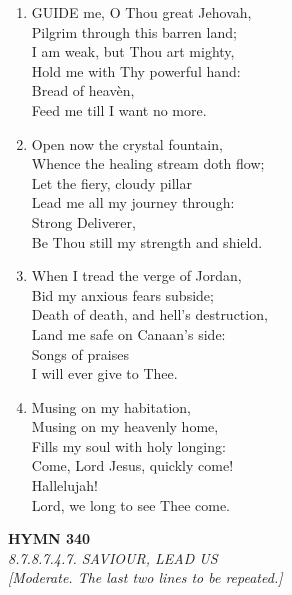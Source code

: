 \begin{enumerate}
    \item GUIDE me, O Thou great Jehovah, \\
        Pilgrim through this barren land; \\
        I am weak, but Thou art mighty, \\
        Hold me with Thy powerful hand: \\
        Bread of heav\`en, \\
        Feed me till I want no more.

    \item Open now the crystal fountain, \\
        Whence the healing stream doth flow; \\
        Let the fiery, cloudy pillar \\
        Lead me all my journey through: \\
        Strong Deliverer, \\
        Be Thou still my strength and shield.

    \item When I tread the verge of Jordan, \\
        Bid my anxious fears subside; \\
        Death of death, and hell's destruction, \\
        Land me safe on Canaan's side: \\
        Songs of praises \\
        I will ever give to Thee.

    \item Musing on my habitation, \\
        Musing on my heavenly home, \\
        Fills my soul with holy longing: \\
        Come, Lord Jesus, quickly come! \\
        Hallelujah! \\
        Lord, we long to see Thee come.

\end{enumerate}

\newpage
\begin{center}
    {\Large \textbf{HYMN 340}}
    \\
    \textit{8.7.8.7.4.7. SAVIOUR, LEAD US}
    \\
    \textit{\small [Moderate. The last two lines to be repeated.]}
\end{center}
\vspace{1em}

